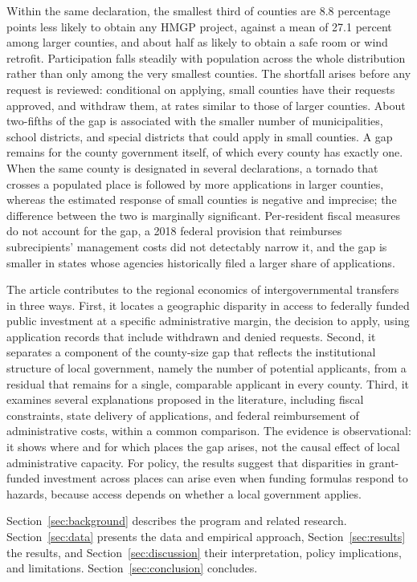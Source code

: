 Within the same declaration, the smallest third of counties are 8.8 percentage points less likely to obtain any HMGP project, against a mean of 27.1 percent among larger counties, and about half as likely to obtain a safe room or wind retrofit. Participation falls steadily with population across the whole distribution rather than only among the very smallest counties. The shortfall arises before any request is reviewed: conditional on applying, small counties have their requests approved, and withdraw them, at rates similar to those of larger counties. About two-fifths of the gap is associated with the smaller number of municipalities, school districts, and special districts that could apply in small counties. A gap remains for the county government itself, of which every county has exactly one. When the same county is designated in several declarations, a tornado that crosses a populated place is followed by more applications in larger counties, whereas the estimated response of small counties is negative and imprecise; the difference between the two is marginally significant. Per-resident fiscal measures do not account for the gap, a 2018 federal provision that reimburses subrecipients' management costs did not detectably narrow it, and the gap is smaller in states whose agencies historically filed a larger share of applications.

The article contributes to the regional economics of intergovernmental transfers in three ways. First, it locates a geographic disparity in access to federally funded public investment at a specific administrative margin, the decision to apply, using application records that include withdrawn and denied requests. Second, it separates a component of the county-size gap that reflects the institutional structure of local government, namely the number of potential applicants, from a residual that remains for a single, comparable applicant in every county. Third, it examines several explanations proposed in the literature, including fiscal constraints, state delivery of applications, and federal reimbursement of administrative costs, within a common comparison. The evidence is observational: it shows where and for which places the gap arises, not the causal effect of local administrative capacity. For policy, the results suggest that disparities in grant-funded investment across places can arise even when funding formulas respond to hazards, because access depends on whether a local government applies.

Section~\ref{sec:background} describes the program and related research. Section~\ref{sec:data} presents the data and empirical approach, Section~\ref{sec:results} the results, and Section~\ref{sec:discussion} their interpretation, policy implications, and limitations. Section~\ref{sec:conclusion} concludes.
